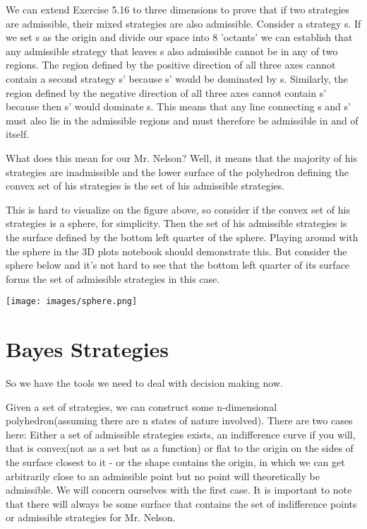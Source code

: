 \documentclass{article}
\begin{document}
We can extend Exercise 5.16 to three dimensions to prove that if two strategies are admissible, their mixed strategies are also admissible. Consider a strategy s. If we set s as the origin and divide our space into 8 'octants' we can establish that any admissible strategy that leaves s also admissible cannot be in any of two regions. The region defined by the positive direction of all three axes cannot contain a second strategy s' because s' would be dominated by s. Similarly, the region defined by the negative direction of all three axes cannot contain s' because then s' would dominate s. This means that any line connecting s and s' must also lie in the admissible regions and must therefore be admissible in and of itself. 

What does this mean for our Mr. Nelson? Well, it means that the majority of his strategies are inadmissible and the lower surface of the polyhedron defining the convex set of his strategies is the set of his admissible strategies. 

This is hard to visualize on the figure above, so consider if the convex set of his strategies is a sphere, for simplicity. Then the set of his admissible strategies is the surface defined by the bottom left quarter of the sphere. Playing around with the sphere in the 3D plots notebook should demonstrate this. But consider the sphere below and it's not hard to see that the bottom left quarter of its surface forms the set of admissible strategies in this case.
\vspace{5mm} %

\texttt{[image: images/sphere.png]}


\section{Bayes Strategies}

So we have the tools we need to deal with decision making now. 

Given a set of strategies, we can construct some n-dimensional polyhedron(assuming there are n states of nature involved). There are two cases here: Either a set of admissible strategies exists, an indifference curve if you will, that is convex(not as a set but as a function) or flat to the origin on the sides of the surface closest to it - or the shape contains the origin, in which we can get arbitrarily close to an admissible point but no point will theoretically be admissible.  We will concern ourselves with the first case. It is important to note that there will always be some surface that contains the set of indifference points or admissible strategies for Mr. Nelson. 
\end{document}
